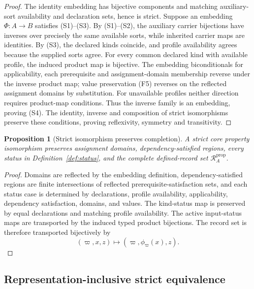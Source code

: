 \documentclass[11pt]{article}
\newcommand{\PropRec}{\mathcal R^{\mathrm{prop}}}
\newtheorem{proposition}[theorem]{Proposition}
\theoremstyle{definition}
\theoremstyle{remark}
\begin{document}
\begin{proof}
The identity embedding has bijective components and matching auxiliary-sort availability and declaration sets, hence is strict.
Suppose an embedding \(\Phi:A\to B\) satisfies (S1)--(S3).
By (S1)--(S2), the auxiliary carrier bijections have inverses over precisely the same available sorts, while inherited carrier maps are identities.
By (S3), the declared kinds coincide, and profile availability agrees because the supplied sorts agree.
For every common declared kind with available profile, the induced product map is bijective.
The embedding biconditionals for applicability, each prerequisite and assignment-domain membership reverse under the inverse product map; value preservation (F5) reverses on the reflected assignment domains by substitution.
For unavailable profiles neither direction requires product-map conditions.
Thus the inverse family is an embedding, proving (S4).
The identity, inverse and composition of strict isomorphisms preserve these conditions, proving reflexivity, symmetry and transitivity.
\end{proof}

\begin{proposition}[Strict isomorphism preserves completion]
A strict core property isomorphism preserves assignment domains, dependency-satisfied regions, every status in Definition~\ref{def:status}, and the complete defined-record set \(\PropRec_A\).
\end{proposition}

\begin{proof}
Domains are reflected by the embedding definition, dependency-satisfied regions are finite intersections of reflected prerequisite-satisfaction sets, and each status case is determined by declarations, profile availability, applicability, dependency satisfaction, domains, and values.
The kind-status map is preserved by equal declarations and matching profile availability.
The active input-status maps are transported by the induced typed product bijections.
The record set is therefore transported bijectively by
\[
(\varpi,x,z)\longmapsto(\varpi,\phi_{\varpi}(x),z).
\]
\end{proof}

\subsection{Representation-inclusive strict equivalence}
\end{document}
